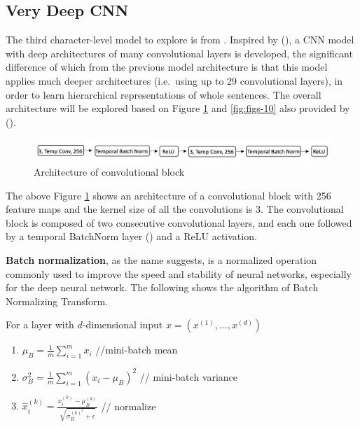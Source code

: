 \documentclass[]{krantz}
\begin{document}
\hypertarget{very-deep-cnn}{%
\subsection{Very Deep CNN}\label{very-deep-cnn}}

The third character-level model to explore is from \citet{Schwenk2017VeryDC}. Inspired by (\citet{Simonyan2015VeryDC}), a CNN model with deep architectures of many convolutional layers is developed, the significant difference of which from the previous model architecture is that this model applies much deeper architectures (i.e.~using up to 29 convolutional layers), in order to learn hierarchical representations of whole sentences. The overall architecture will be explored based on Figure \ref{fig:figs-9} and \ref{fig:figs-10} also provided by (\citet{Schwenk2017VeryDC}).

\begin{figure}[ht]

{\centering \includegraphics[width=1\linewidth]{figures/01-03-cnns-and-their-applications-in-nlp/Convolutional_Block} 

}

\caption{\label{fig:fig_9} Architecture of convolutional block}\label{fig:figs-9}
\end{figure}

The above Figure \ref{fig:figs-9} shows an architecture of a convolutional block with 256 feature maps and the kernel size of all the convolutions is 3. The convolutional block is composed of two consecutive convolutional layers, and each one followed by a temporal BatchNorm layer (\citet{Ioffe2015BatchNA}) and a ReLU activation.

\textbf{Batch normalization}, as the name suggests, is a normalized operation commonly used to improve the speed and stability of neural networks, especially for the deep neural network. The following shows the algorithm of Batch Normalizing Transform.

For a layer with \(d\)-dimensional input \(x = (x^{(1)},...,x^{(d)})\)

\begin{enumerate}
\def\labelenumi{\arabic{enumi}.}
\item
  \(\mu_B = \frac 1 m \sum_{i=1}^m x_i\) //mini-batch mean
\item
  \(\sigma_B^2 = \frac 1 m \sum_{i=1}^m (x_i-\mu_B)^2\) // mini-batch variance
\item
  \(\hat{x}_{i}^{(k)} = \frac {x_i^{(k)}-\mu_B^{(k)}}{\sqrt{\sigma_B^{(k)^2}+\epsilon}}\) // normalize
\end{enumerate}
\end{document}
